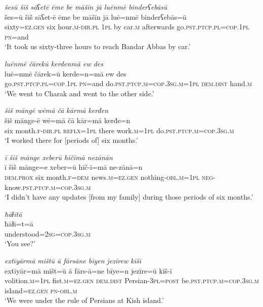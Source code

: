 \ea \label{ŽM.33}
\textit{šesū šiš sāʕetē ēme be māšīn jā luēnmē binderʕebāsū} \\ 
\gll šes=ū šiš sāʕet-ē ēme be māšīn jā luē=nmē binderʕebās=ū \\ 
 sixty\textsc{=ez.gen} six hour\textsc{.m}\textsc{-dir}\textsc{.pl} \textsc{1pl} by car\textsc{.m} afterwards go\textsc{.pst}\textsc{.ptcp}\textsc{.pl}\textsc{=cop}\textsc{.\textsc{1pl}} \textsc{pn}=and \\ 
\glt `It took us sixty-three hours to reach Bandar Abbas by car.'
\z 
 
\ea \label{ŽM.34}
\textit{luēnmē čārekū kerdenmā ew des} \\ 
\gll luē=nmē čārek=ū kerde=n=mā ew des \\ 
 go\textsc{.pst}\textsc{.ptcp}\textsc{.pl}\textsc{=cop}\textsc{.\textsc{1pl}} \textsc{pn}=and do\textsc{.pst}\textsc{.ptcp}\textsc{.m}\textsc{=cop}\textsc{.3sg}\textsc{.m}\textsc{=\textsc{1pl}} \textsc{dem.dist} hand\textsc{.m} \\ 
\glt `We went to Charak and went to the other side.'
\z 
 
\ea \label{ŽM.35}
\textit{šiš māngē wēmā čā kārmā kerđen} \\ 
\gll šiš mānge-ē wē=mā čā kār=mā kerđe=n \\ 
 six month\textsc{.f}\textsc{-dir}\textsc{.pl} \textsc{reflx}\textsc{=\textsc{1pl}} there work\textsc{.m}\textsc{=\textsc{1pl}} do\textsc{.pst}\textsc{.ptcp}\textsc{.m}\textsc{=cop}\textsc{.3sg}\textsc{.m} \\ 
\glt `I worked there for [periods of] six months.'
\z 
 
\ea \label{ŽM.36}
\textit{ī šiš mānge xeberū hīčīmā nezānān} \\ 
\gll ī šiš mānge=e xeber=ū hīč-ī=mā ne-zānā=n \\ 
 \textsc{dem.prox} six month\textsc{.f}\textsc{=dem} news\textsc{.m}\textsc{=ez.gen} nothing\textsc{-obl}\textsc{.m}\textsc{=\textsc{1pl}} \textsc{neg-}know\textsc{.pst}\textsc{.ptcp}\textsc{.m}\textsc{=cop}\textsc{.3sg}\textsc{.m} \\ 
\glt `I didn’t have any updates [from my family] during those periods of six months.'
\z 
 
\ea \label{ŽM.37}
\textit{ħāɫītā} \\ 
\gll ħāɫī=t=ā \\ 
 understood\textsc{=\textsc{2sg}}\textsc{=cop}\textsc{.3sg}\textsc{.m} \\ 
\glt `You see?'
\z 
 
\ea \label{ŽM.38}
\textit{extīyārmā mištū ā fārsāne bīyen jezīrew kīšī} \\ 
\gll extīyār=mā mišt=ū ā fārs-ā=ne bīye=n jezīre=ū kīš-ī \\ 
 volition\textsc{.m}\textsc{=\textsc{1pl}} fist\textsc{.m}\textsc{=ez.gen} \textsc{dem.dist} Persian\textsc{-3pl}\textsc{=\textsc{post}} be\textsc{.pst}\textsc{.ptcp}\textsc{.m}\textsc{=cop}\textsc{.3sg}\textsc{.m} island\textsc{=ez.gen} \textsc{pn}\textsc{-obl}\textsc{.m} \\ 
\glt `We were under the rule of Persians at Kish island.'
\z 
 
